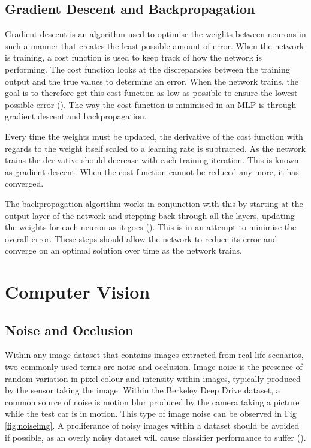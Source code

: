 \documentclass[12pt]{report}
\begin{document}
\newpage
\subsection{Gradient Descent and Backpropagation}
\begin{flushleft}
Gradient descent is an algorithm used to optimise the weights between neurons in such a manner that creates the least possible amount of error. When the network is training, a cost function is used to keep track of how the network is performing. The cost function looks at the discrepancies between the training output and the true values to determine an error. When the network trains, the goal is to therefore get this cost function as low as possible to ensure the lowest possible error (\cite{rumelhart1985learning}). The way the cost function is minimised in an MLP is through gradient descent and backpropagation.

Every time the weights must be updated, the derivative of the cost function with regards to the weight itself scaled to a learning rate is subtracted. As the network trains the derivative should decrease with each training iteration. This is known as gradient descent. When the cost function cannot be reduced any more, it has converged.

The backpropagation algorithm works in conjunction with this by starting at the output layer of the network and stepping back through all the layers, updating the weights for each neuron as it goes (\cite{rumelhart1985learning}). This is in an attempt to minimise the overall error. These steps should allow the network to reduce its error and converge on an optimal solution over time as the network trains.
\end{flushleft}

\section{Computer Vision}
\subsection{Noise and Occlusion}
\begin{flushleft}
Within any image dataset that contains images extracted from real-life scenarios, two commonly used terms are noise and occlusion. Image noise is the presence of random variation in pixel colour and intensity within images, typically produced by the sensor taking the image. Within the Berkeley Deep Drive dataset, a common source of noise is motion blur produced by the camera taking a picture while the test car is in motion. This type of image noise can be observed in Fig \ref{fig:noiseimg}. A proliferance of noisy images within a dataset should be avoided if possible, as an overly noisy dataset will cause classifier performance to suffer (\cite{xiao2015learning}).
\end{flushleft}
\end{document}
